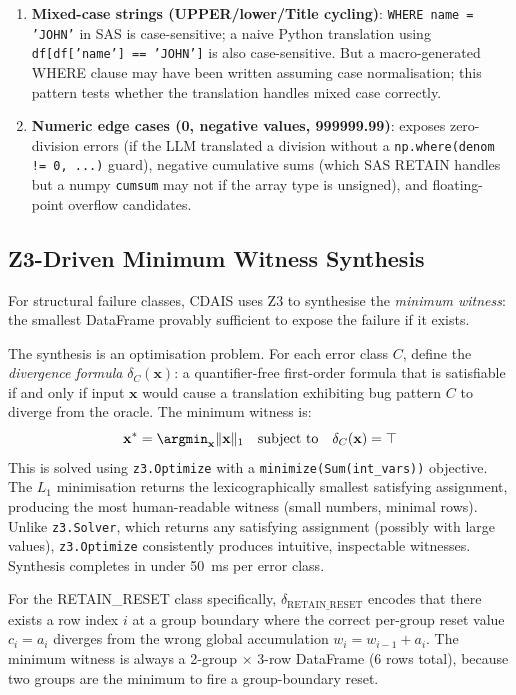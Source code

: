 \begin{enumerate}
  \item \textbf{Mixed-case strings (UPPER/lower/Title cycling)}:
    \texttt{WHERE name = 'JOHN'} in SAS is case-sensitive; a naive Python
    translation using \texttt{df[df['name'] == 'JOHN']} is also case-sensitive.
    But a macro-generated WHERE clause may have been written assuming case
    normalisation; this pattern tests whether the translation handles
    mixed case correctly.

  \item \textbf{Numeric edge cases (0, negative values, 999999.99)}: exposes
    zero-division errors (if the LLM translated a division without a
    \texttt{np.where(denom != 0, ...)} guard), negative cumulative sums (which
    SAS RETAIN handles but a numpy \texttt{cumsum} may not if the array type
    is unsigned), and floating-point overflow candidates.
\end{enumerate}

\subsection{Z3-Driven Minimum Witness Synthesis}
\label{subsec:cdais-z3}

For structural failure classes, CDAIS uses Z3 to synthesise the
\emph{minimum witness}: the smallest DataFrame provably sufficient to expose
the failure if it exists.

The synthesis is an optimisation problem. For each error class $C$, define
the \emph{divergence formula} $\delta_C(\mathbf{x})$: a quantifier-free
first-order formula that is satisfiable if and only if input $\mathbf{x}$
would cause a translation exhibiting bug pattern $C$ to diverge from the
oracle. The minimum witness is:
\begin{equation}
  \mathbf{x}^* = \argmin_{\mathbf{x}} \|\mathbf{x}\|_1 \quad
  \text{subject to} \quad \delta_C(\mathbf{x}) = \top
  \label{eq:cdais-opt}
\end{equation}
This is solved using \texttt{z3.Optimize} with a \texttt{minimize(Sum(int\_vars))}
objective. The $L_1$ minimisation returns the lexicographically smallest
satisfying assignment, producing the most human-readable witness (small
numbers, minimal rows). Unlike \texttt{z3.Solver}, which returns any
satisfying assignment (possibly with large values), \texttt{z3.Optimize}
consistently produces intuitive, inspectable witnesses. Synthesis completes
in under 50~ms per error class.

For the RETAIN\_RESET class specifically, $\delta_{\text{RETAIN\_RESET}}$
encodes that there exists a row index $i$ at a group boundary where the
correct per-group reset value $c_i = a_i$ diverges from the wrong global
accumulation $w_i = w_{i-1} + a_i$. The minimum witness is always a
2-group $\times$ 3-row DataFrame (6 rows total), because two groups are the
minimum to fire a group-boundary reset.

